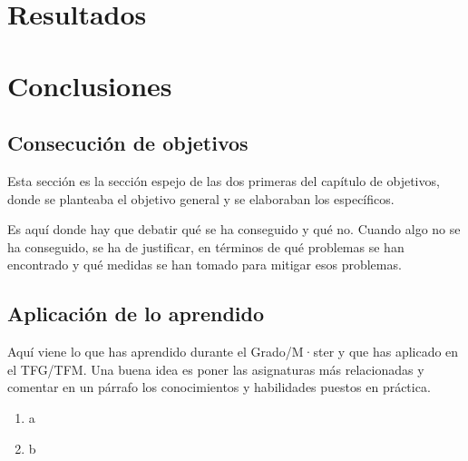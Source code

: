 \documentclass[a4paper, 12pt]{book}
\begin{document}

\cleardoublepage
\chapter{Resultados}



\cleardoublepage
\chapter{Conclusiones}
\label{chap:conclusiones}


\section{Consecución de objetivos}
\label{sec:consecucion-objetivos}

Esta sección es la sección espejo de las dos primeras del capítulo de objetivos, donde se planteaba el objetivo general y se elaboraban los específicos.

Es aquí donde hay que debatir qué se ha conseguido y qué no. Cuando algo no se ha conseguido, se ha de justificar, en términos de qué problemas se han encontrado y qué medidas se han tomado para mitigar esos problemas.


\section{Aplicación de lo aprendido}
\label{sec:aplicacion}

Aquí viene lo que has aprendido durante el Grado/M·ster y que has aplicado en el TFG/TFM. Una buena idea es poner las asignaturas más relacionadas y comentar en un párrafo los conocimientos y habilidades puestos en práctica.

\begin{enumerate}
  \item a
  \item b
\end{enumerate}
\end{document}
